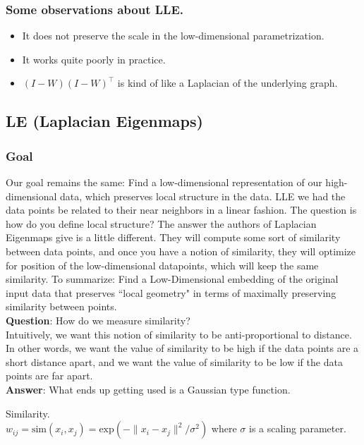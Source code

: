 \subsubsection*{Some observations about LLE.}
\begin{itemize}
\item It does not preserve the scale in the low-dimensional parametrization.
\item It works quite poorly in practice.
\item $(I-W)(I-W)^\intercal$ is kind of like a Laplacian of the underlying graph.
\end{itemize}

\subsection*{LE (Laplacian Eigenmaps)}
\subsubsection*{Goal}
Our goal remains the same: Find a low-dimensional representation of our high-dimensional data, which preserves local structure in the data. LLE we had the data points be related to their near neighbors in a linear fashion. The question is how do you define local structure? The answer the authors of Laplacian Eigenmaps give is a little different. They will compute some sort of similarity between data points, and once you have a notion of similarity, they will optimize for position of the low-dimensional datapoints, which will keep the same similarity. 
To summarize: Find a Low-Dimensional embedding of the original input data that preserves ``local geometry" in terms of maximally preserving similarity
between points.\\ 
\textbf{Question}: How do we measure similarity?\\
Intuitively, we want this notion of similarity to be anti-proportional to distance. In other words, we want the value of similarity to be high if the data points are a short distance apart, and we want the value of similarity to be low if the data points are far apart.\\
\textbf{Answer}: What ends up getting used is a Gaussian type function. 

\begin{definition} Similarity. \\
$w_{ij} = \textrm{sim}(x_i, x_j) = \textrm{exp}(-\|x_i - x_j\|^2/\sigma^2)$ where $\sigma$ is a scaling parameter. 
\end{definition}


